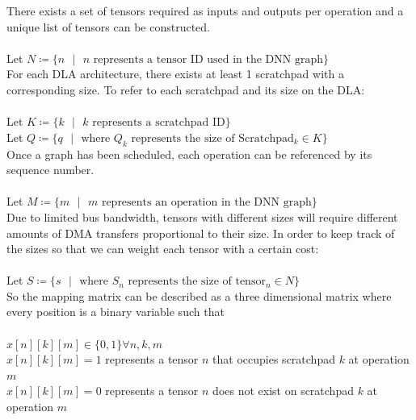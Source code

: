 
There exists a set of tensors required as inputs and outputs per operation and a unique list of tensors can be constructed.\\
\\
Let $N \coloneqq \{ n \text{ }  | \text{ } n   \text{ represents a tensor ID used in the DNN graph}\}$\\

For each DLA architecture, there exists at least 1 scratchpad with a corresponding size. To refer to each scratchpad and its size on the DLA:\\
\\
Let $K \coloneqq \{ k \text{ }  | \text{ } k   \text{ represents a scratchpad ID}\}$\\
Let $Q \coloneqq \{ q \text{ }| \text{ } \text{where } Q_k \text{ represents the size of Scratchpad$_k \in K$}\}$\\

Once a graph has been scheduled, each operation can be referenced by its sequence number.\\
\\
Let $M \coloneqq \{ m \text{ }  | \text{ } m   \text{ represents an operation in the DNN graph}\}$\\

Due to limited bus bandwidth, tensors with different sizes will require
different amounts of DMA transfers proportional to their size. In order to keep
track of the sizes so that we can weight each tensor with a certain cost:\\
\\
Let $S \coloneqq \{ s \text{ }| \text{ } \text{where } S_n \text{ represents the size of tensor$_n \in N$}\}$\\


So the mapping matrix can be described as a three dimensional matrix where every position is a binary variable such that\\
\\
$x[n][k][m] \in \{0, 1\} \forall n,k,m $\\
$x[n][k][m] = 1$ represents a tensor $n$ that occupies scratchpad $k$ at operation $m$ \\
$x[n][k][m] = 0$ represents a tensor $n$ does not exist on scratchpad $k$ at operation $m$\\

